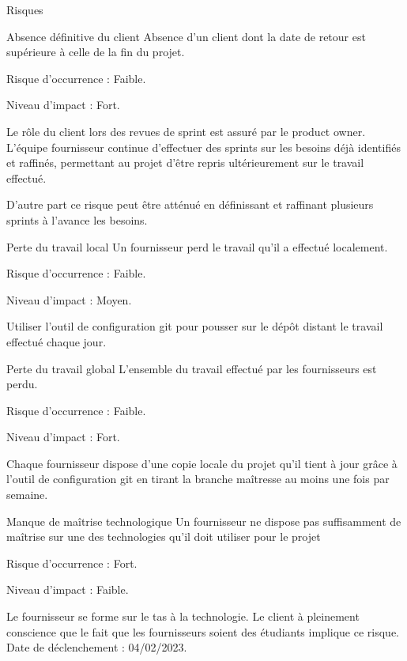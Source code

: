 \documentclass[]{article}
\begin{document}
{\begin{section}{Risques}
 \newpage

 \begin{subsection}{Absence définitive du client}
     Absence d'un client dont la date de retour est supérieure à celle de la fin du projet.

     Risque d’occurrence : Faible.

     Niveau d’impact : Fort.

     Le rôle du client lors des revues de sprint est assuré par le product owner. L'équipe fournisseur continue d'effectuer des sprints sur les besoins déjà identifiés et raffinés, permettant au projet d'être repris ultérieurement sur le travail effectué.

     D'autre part ce risque peut être atténué en définissant et raffinant plusieurs sprints à l'avance les besoins.
 \end{subsection}

 \begin{subsection}{Perte du travail local}
     Un fournisseur perd le travail qu'il a effectué localement.

     Risque d’occurrence : Faible.

     Niveau d’impact : Moyen.

     Utiliser l'outil de configuration git pour pousser sur le dépôt distant le travail effectué chaque jour.
 \end{subsection}

 \begin{subsection}{Perte du travail global}
     L'ensemble du travail effectué par les fournisseurs est perdu.

     Risque d’occurrence : Faible.

     Niveau d’impact : Fort.

     Chaque fournisseur dispose d'une copie locale du projet qu'il tient à jour grâce à l'outil de configuration git en tirant la branche maîtresse au moins une fois par semaine.
 \end{subsection}

 \newpage

 \begin{subsection}{Manque de maîtrise technologique}
     Un fournisseur ne dispose pas suffisamment de maîtrise sur une des technologies qu'il doit utiliser pour le projet

     Risque d’occurrence : Fort.

     Niveau d’impact : Faible.

     Le fournisseur se forme sur le tas à la technologie. Le client à pleinement conscience que le fait que les fournisseurs soient des étudiants implique ce risque.
     \\[5mm]
     Date de déclenchement : 04/02/2023.


\end{subsection}
\end{section}}
\end{document}
